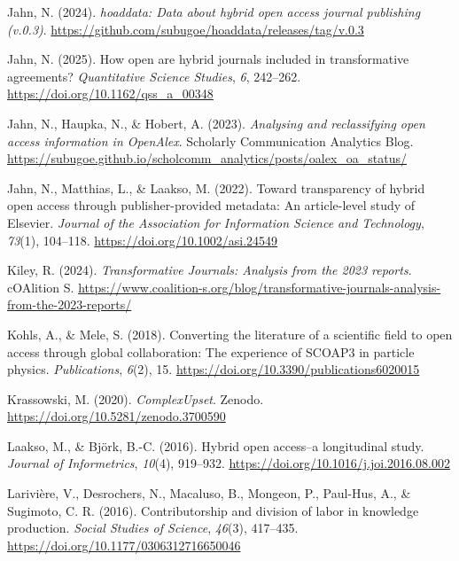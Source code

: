 \documentclass[a4paper,man,floatsintext,longtable,noextraspace,10pt]{apa6}
\newlength{\cslhangindent}
\newenvironment{CSLReferences}[2] %
{\begin{list}{}{%
  \setlength{\itemindent}{0pt}
  \setlength{\leftmargin}{0pt}
  \setlength{\parsep}{0pt}
  \ifodd #1
  \setlength{\leftmargin}{\cslhangindent}
  \setlength{\itemindent}{-1\cslhangindent}
  \fi
  \setlength{\itemsep}{#2\baselineskip}}}
{\end{list}}
\begin{document}
\begin{CSLReferences}{1}{0}
Jahn, N. (2024). \emph{{hoaddata}: Data about hybrid open access journal
publishing (v.0.3)}.
\url{https://github.com/subugoe/hoaddata/releases/tag/v.0.3}

Jahn, N. (2025). How open are hybrid journals included in transformative
agreements? \emph{Quantitative Science Studies}, \emph{6}, 242--262.
\url{https://doi.org/10.1162/qss_a_00348}

Jahn, N., Haupka, N., \& Hobert, A. (2023). \emph{Analysing and
reclassifying open access information in OpenAlex}. {Scholarly
Communication Analytics Blog}.
\url{https://subugoe.github.io/scholcomm_analytics/posts/oalex_oa_status/}

Jahn, N., Matthias, L., \& Laakso, M. (2022). Toward transparency of
hybrid open access through publisher-provided metadata: An article-level
study of {Elsevier}. \emph{Journal of the Association for Information
Science and Technology}, \emph{73}(1), 104--118.
\url{https://doi.org/10.1002/asi.24549}

Kiley, R. (2024). \emph{{Transformative Journals}: Analysis from the
2023 reports}. {cOAlition S}.
\url{https://www.coalition-s.org/blog/transformative-journals-analysis-from-the-2023-reports/}

Kohls, A., \& Mele, S. (2018). Converting the literature of a scientific
field to open access through global collaboration: The experience of
SCOAP3 in particle physics. \emph{Publications}, \emph{6}(2), 15.
\url{https://doi.org/10.3390/publications6020015}

Krassowski, M. (2020). \emph{ComplexUpset}. Zenodo.
\url{https://doi.org/10.5281/zenodo.3700590}

Laakso, M., \& Björk, B.-C. (2016). Hybrid open access--a longitudinal
study. \emph{Journal of Informetrics}, \emph{10}(4), 919--932.
\url{https://doi.org/10.1016/j.joi.2016.08.002}

Larivière, V., Desrochers, N., Macaluso, B., Mongeon, P., Paul-Hus, A.,
\& Sugimoto, C. R. (2016). Contributorship and division of labor in
knowledge production. \emph{Social Studies of Science}, \emph{46}(3),
417--435. \url{https://doi.org/10.1177/0306312716650046}


\end{CSLReferences}
\end{document}
